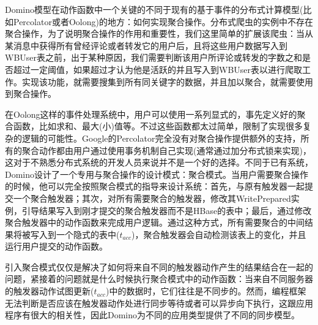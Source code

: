 Domino模型在动作函数中一个关键的不同于现有的基于事件的分布式计算模型(比如Percolator或者Oolong)的地方：如何实现聚合操作。分布式爬虫的实例中不存在聚合操作，为了说明聚合操作的作用和重要性，我们这里简单的扩展该爬虫：当从某消息中获得所有曾经评论或者转发它的用户后，且将这些用户数据写入到WBUser表之前，出于某种原因，我们需要判断该用户所评论或转发的字数之和是否超过一定阈值，如果超过才认为他是活跃的并且写入到WBUser表以进行爬取工作。实现该功能，就需要搜集到所有同关键字的数据，并且加以聚合，就需要使用到聚合操作。

在Oolong这样的事件处理系统中，用户可以使用一系列显式的，事先定义好的聚合函数，比如求和、最大(小)值等。不过这些函数都太过简单，限制了实现很多复杂的逻辑的可能性。Google的Percolator完全没有对聚合操作提供额外的支持，所有的聚合动作都由用户通过使用事务机制自己实现(通常通过加分布式锁来实现)，这对于不熟悉分布式系统的开发人员来说并不是一个好的选择。不同于已有系统，Domino设计了一个专用与聚合操作的设计模式：聚合模式。当用户需要聚合操作的时候，他可以完全按照聚合模式的指导来设计系统：首先，与原有触发器一起提交一个聚合触发器；其次，对所有需要聚合的触发器，修改其WritePrepared实例，引导结果写入到刚才提交的聚合触发器而不是HBase的表中；最后，通过修改聚合触发器中的动作函数来完成用户逻辑。通过这种方式，所有需要聚合的中间结果将被写入到一个隐式的表中($t_{acc}$)，聚合触发器会自动检测该表上的变化，并且运行用户提交的动作函数。

引入聚合模式仅仅是解决了如何将来自不同的触发器动作产生的结果结合在一起的问题，紧接着的问题就是什么时候执行聚合模式中的动作函数：当来自不同服务器的触发器动作试图更新($t_{acc}$)中的数据时，它们往往是不同步的。然而，编程框架无法判断是否应该在触发器动作处进行同步等待或者可以异步向下执行，这跟应用程序有很大的相关性，因此Domino为不同的应用类型提供了不同的同步模型。

